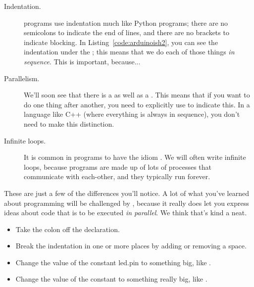 \begin{description}
	\item[Indentation.] \occam programs use indentation much like Python programs; there are no semicolons to indicate the end of lines, and there are no brackets to indicate blocking. In Listing~\ref{code:arduinoish2}, you can see the indentation under the \SEQ; this means that we do each of those things \emph{in sequence}. This is important, because...
	\item[Parallelism.] We'll soon see that there is a \PAR as well as a \SEQ. This means that if you want to do one thing after another, you need to explicitly use \SEQ to indicate this. In a language like C++ (where everything is always in sequence), you don't need to make this distinction.
	\item[Infinite loops.] It is common in \occam programs to have the idiom \WHILETRUE. We will often write infinite loops, because \occam programs are made up of lots of processes that communicate with each-other, and they typically run forever.
\end{description}

These are just a few of the differences you'll notice. A lot of what you've learned about programming will be challenged by \occam, because it really does let you express ideas about code that is to be executed \emph{in parallel}. We think that's kind a neat.

\makingthingsbreak

\begin{itemize}
	\item Take the colon off the \VALINT declaration. 
	\item Break the indentation in one or more places by adding or removing a space.
	\item Change the value of the constant {\constant led.pin} to something big, like {}.
	\item Change the value of the constant {} to something really big, like {}.
\end{itemize}

\seealso

\XXX
